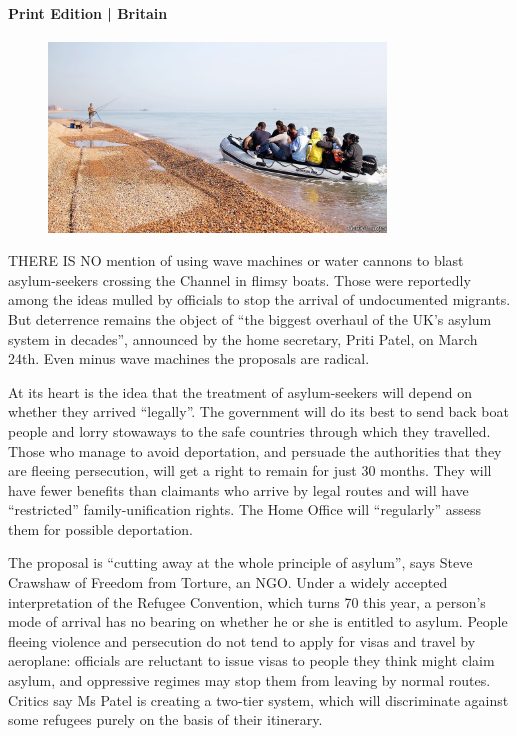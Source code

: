 \documentclass{article}
\begin{document}
\paragraph{Print Edition | Britain  \quad \color{gray}{Mar 27th 2021 }}
\begin{figure}[h]
\centering
\includegraphics[width=0.8\textwidth]{images/20210327_BRP003_0.jpg}
\end{figure}
\lettrine{T}HERE IS NO mention of using wave machines or water cannons to blast asylum-seekers crossing the Channel in flimsy boats. Those were reportedly among the ideas mulled by officials to stop the arrival of undocumented migrants. But deterrence remains the object of ``the biggest overhaul of the UK's asylum system in decades'', announced by the home secretary, Priti Patel, on March 24th. Even minus wave machines the proposals are radical. 

At its heart is the idea that the treatment of asylum-seekers will depend on whether they arrived ``legally''. The government will do its best to send back boat people and lorry stowaways to the safe countries through which they travelled. Those who manage to avoid deportation, and persuade the authorities that they are fleeing persecution, will get a right to remain for just 30 months. They will have fewer benefits than claimants who arrive by legal routes and will have ``restricted'' family-unification rights. The Home Office will ``regularly'' assess them for possible deportation. 

The proposal is ``cutting away at the whole principle of asylum'', says Steve Crawshaw of Freedom from Torture, an NGO. Under a widely accepted interpretation of the Refugee Convention, which turns 70 this year, a person's mode of arrival has no bearing on whether he or she is entitled to asylum. People fleeing violence and persecution do not tend to apply for visas and travel by aeroplane: officials are reluctant to issue visas to people they think might claim asylum, and oppressive regimes may stop them from leaving by normal routes. Critics say Ms Patel is creating a two-tier system, which will discriminate against some refugees purely on the basis of their itinerary. 
\end{document}
